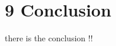 \chapter*{9    Conclusion}
\setcounter{chapter}{9}
\setcounter{section}{0}

there is the conclusion !!